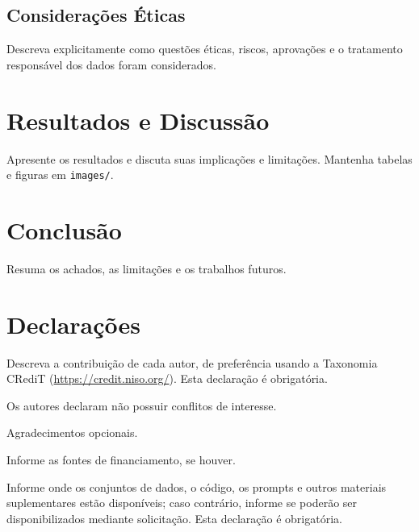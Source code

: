 \documentclass{sbc2023}
\begin{document}
\subsection{Considerações Éticas}
\label{sec:ethics}

Descreva explicitamente como questões éticas, riscos, aprovações e o tratamento responsável dos dados foram considerados.

\section{Resultados e Discussão}
\label{sec:results}

Apresente os resultados e discuta suas implicações e limitações. Mantenha tabelas e figuras em \texttt{images/}.


\section{Conclusão}
\label{sec:conclusion}

Resuma os achados, as limitações e os trabalhos futuros.

\section*{Declarações}

\begin{contributions}
Descreva a contribuição de cada autor, de preferência usando a Taxonomia CRediT (\href{https://credit.niso.org/}{https://credit.niso.org/}). Esta declaração é obrigatória.
\end{contributions}

\begin{interests}
Os autores declaram não possuir conflitos de interesse.
\end{interests}

\begin{acknowledgements}
Agradecimentos opcionais.
\end{acknowledgements}

\begin{funding}
Informe as fontes de financiamento, se houver.
\end{funding}

\begin{materials}
Informe onde os conjuntos de dados, o código, os prompts e outros materiais suplementares estão disponíveis; caso contrário, informe se poderão ser disponibilizados mediante solicitação. Esta declaração é obrigatória.
\end{materials}



\end{document}
